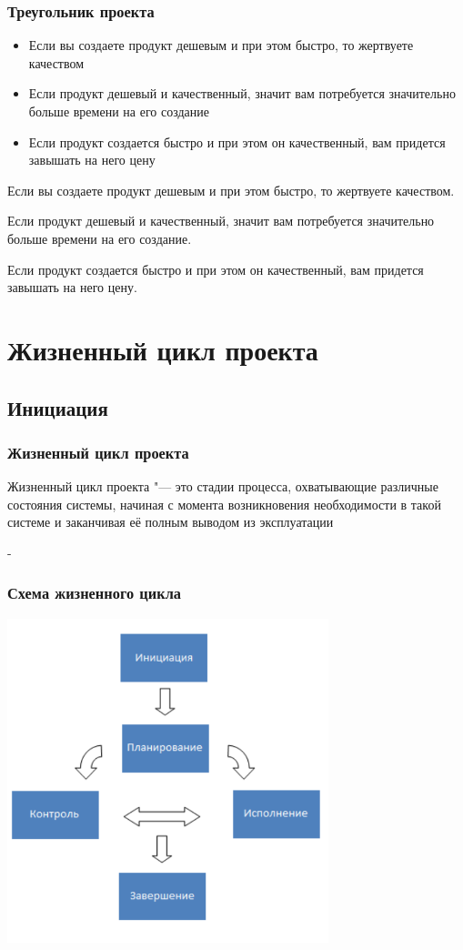 \documentclass{../industrial-development}
\begin{document}
    \begin{frame} \frametitle{Треугольник проекта}
	\begin{itemize}
		\item Если вы создаете продукт дешевым и при этом быстро, то жертвуете качеством
		\item Если продукт дешевый и качественный, значит вам потребуется значительно больше времени на его создание
		\item Если продукт создается быстро и при этом он качественный, вам придется завышать на него цену
	\end{itemize}
    \end{frame}
    \lecturenotes

Если вы создаете продукт дешевым и при этом быстро, то жертвуете качеством.

Если продукт дешевый и качественный, значит вам потребуется значительно больше времени на его создание.

Если продукт создается быстро и при этом он качественный, вам придется завышать на него цену.
    
    \section{Жизненный цикл проекта}

    \subsection{Инициация}

    \begin{frame} \frametitle{Жизненный цикл проекта}
	\begin{definition}
		Жизненный цикл проекта "--- это стадии процесса, охватывающие различные состояния системы, начиная с момента возникновения необходимости в такой системе и заканчивая её полным выводом из эксплуатации
	\end{definition}
    \end{frame}
    \lecturenotes
	-

    \begin{frame} \frametitle{Схема жизненного цикла}
         \centerline{\includegraphics[width=0.7\textwidth]{manageproject.pdf}}
    \end{frame}
    \lecturenotes
\end{document}
